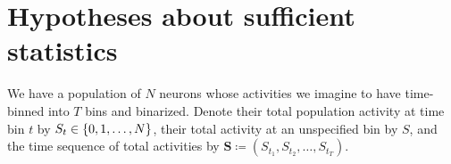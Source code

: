 \documentclass[\ifafour a4paper,12pt,\else a5paper,10pt,\fi%
onecolumn,oneside,article,%
british%
]{memoir}
\title{\propertitle}
\author{%
\hspace*{\stretch{1}}%
\parbox{0.5\linewidth}%
{\protect\centering P.G.L.  Porta Mana\\%
\footnotesize\epost{\email{piero.mana}{ntnu.no}}}%
\hspace*{\stretch{1}}%
}
\date{Draft of \today\ (first drafted \firstdraft)}
\theoremstyle{remark}
\theoremstyle{innote}
\newcommand*{\amp}{\&}
\newcommand*{\asudedication}[1]{%
{\par\centering\textit{#1}\par}}
\newcommand*{\defd}{\coloneqq}
\DeclarePairedDelimiter\set{\{}{\}}
\renewcommand*{\|}{\nonscript\,\vert\nonscript\;\mathopen{}}
\newcommand*{\yS}{S}
\newcommand*{\ySt}{\bm{\yS}}
\begin{document}
\captiondelim{\quad}\captionnamefont{\footnotesize}\captiontitlefont{\footnotesize}
\frenchspacing
\maketitle

\abstractrunin
\abslabeldelim{}
\renewcommand*{\abstractname}{}
\setlength{\absleftindent}{0pt}
\setlength{\absrightindent}{0pt}
\setlength{\abstitleskip}{-\absparindent}
\begin{abstract}%
  \noindent ***
\\\noindent\emph{\footnotesize Note: Dear Reader
    \amp\ Peer, this manuscript is being peer-reviewed by you. Thank you.}
\end{abstract}
\frenchspacing





\section{Hypotheses about sufficient statistics}
\label{sec:hypotheses}



We have a population of $N$ neurons whose activities we imagine to have
time-binned into $T$ bins and binarized. Denote their total population
activity at time bin $t$ by $\yS_{t} \in \set{0,1,\dotsc,N}$, their total
activity at an unspecified bin by $\yS$, and the time sequence of total
activities by $\ySt\defd ( \yS_{t_1}, \yS_{t_2}, \dotsc, \yS_{t_T} )$.
\end{document}
